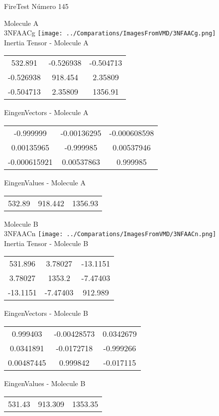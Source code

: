 \vtab[-2cm]
\begin{center}
{\large FireTest \tab Número 145}
\end{center}
\begin{multicols}{2}
\begin{center}

Molecule A \\ 
3NFAACg
\texttt{[image: ../Comparations/ImagesFromVMD/3NFAACg.png]}
\\
Inertia Tensor - Molecule A \\
\vtab

\begin{tabular}{|c c c|}
532.891	 & 	-0.526938	 & 	-0.504713	 \\
-0.526938	 & 	918.454	 & 	2.35809	 \\
-0.504713	 & 	2.35809	 & 	1356.91
\end{tabular}

\vtab
 EingenVectors - Molecule A     \\
\vtab
\begin{tabular}{|c c c|}
-0.999999	 & 	-0.00136295	 & 	-0.000608598	 \\
0.00135965	 & 	-0.999985	 & 	0.00537946	 \\
-0.000615921	 & 	0.00537863	 & 	0.999985
\end{tabular}

\vtab
 EingenValues - Molecule A     \\
\vtab
\begin{tabular}{|c c c|}
532.89	 & 	918.442	 & 	1356.93	 \\
\end{tabular}
\columnbreak

Molecule B \\ 
3NFAACn
\texttt{[image: ../Comparations/ImagesFromVMD/3NFAACn.png]}
\\
Inertia Tensor - Molecule B \\
\vtab

\begin{tabular}{|c c c|}
531.896	 & 	3.78027	 & 	-13.1151	 \\
3.78027	 & 	1353.2	 & 	-7.47403	 \\
-13.1151	 & 	-7.47403	 & 	912.989
\end{tabular}

\vtab
 EingenVectors - Molecule B     \\
\vtab
\begin{tabular}{|c c c|}
0.999403	 & 	-0.00428573	 & 	0.0342679	 \\
0.0341891	 & 	-0.0172718	 & 	-0.999266	 \\
0.00487445	 & 	0.999842	 & 	-0.017115
\end{tabular}

\vtab
 EingenValues - Molecule B     \\
\vtab
\begin{tabular}{|c c c|}
531.43	 & 	913.309	 & 	1353.35	 \\
\end{tabular}

\end{center}
\end{multicols}
